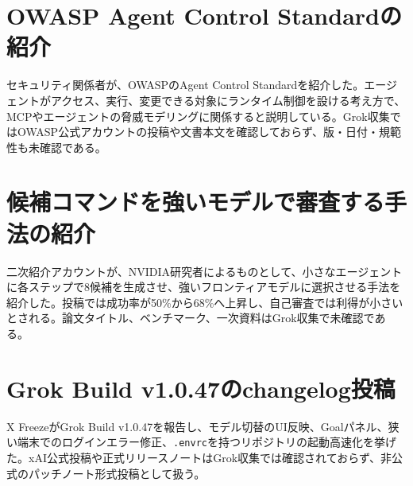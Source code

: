 \section{OWASP Agent Control Standardの紹介}
セキュリティ関係者が、OWASPのAgent Control Standardを紹介した。エージェントがアクセス、実行、変更できる対象にランタイム制御を設ける考え方で、MCPやエージェントの脅威モデリングに関係すると説明している。Grok収集ではOWASP公式アカウントの投稿や文書本文を確認しておらず、版・日付・規範性も未確認である。

\section{候補コマンドを強いモデルで審査する手法の紹介}
二次紹介アカウントが、NVIDIA研究者によるものとして、小さなエージェントに各ステップで8候補を生成させ、強いフロンティアモデルに選択させる手法を紹介した。投稿では成功率が50\%から68\%へ上昇し、自己審査では利得が小さいとされる。論文タイトル、ベンチマーク、一次資料はGrok収集で未確認である。

\section{Grok Build v1.0.47のchangelog投稿}
X FreezeがGrok Build v1.0.47を報告し、モデル切替のUI反映、Goalパネル、狭い端末でのログインエラー修正、\texttt{.envrc}を持つリポジトリの起動高速化を挙げた。xAI公式投稿や正式リリースノートはGrok収集では確認されておらず、非公式のパッチノート形式投稿として扱う。

